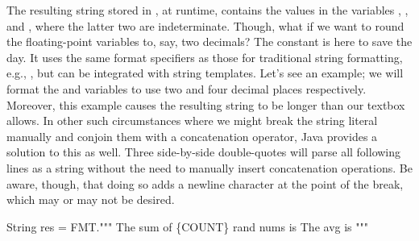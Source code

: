 The resulting string stored in , at runtime, contains the values in the variables , , and , where the latter two are indeterminate. Though, what if we want to round the floating-point variables to, say, two decimals? The  constant is here to save the day. It uses the same format specifiers as those for traditional string formatting, e.g., , but can be integrated with string templates. Let's see an example; we will format the  and  variables to use two and four decimal places respectively. Moreover, this example causes the resulting string to be longer than our textbox allows. In other such circumstances where we might break the string literal manually and conjoin them with a concatenation operator, Java provides a solution to this as well. Three side-by-side double-quotes will parse all following lines as a string without the need to manually insert concatenation operations. Be aware, though, that doing so adds a newline character at the point of the break, which may or may not be desired.

\begin{verbnobox}[\small]
String res = FMT."""
  The sum of \{COUNT\} rand nums is %
  The avg is %
  """
\end{verbnobox}

